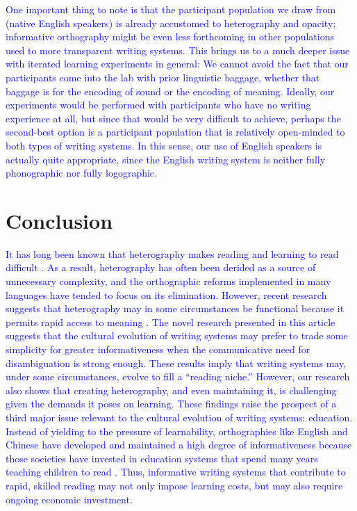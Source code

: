 \documentclass[doc,biblatex]{apa7}
\newcommand\newmaterial[1]{\textcolor{blue}{#1}}
\begin{document}
\newmaterial{One important thing to note is that the participant population we draw from (native English speakers) is already accustomed to heterography and opacity; informative orthography might be even less forthcoming in other populations used to more transparent writing systems. This brings us to a much deeper issue with iterated learning experiments in general: We cannot avoid the fact that our participants come into the lab with prior linguistic baggage, whether that baggage is for the encoding of sound or the encoding of meaning. Ideally, our experiments would be performed with participants who have no writing experience at all, but since that would be very difficult to achieve, perhaps the second-best option is a participant population that is relatively open-minded to both types of writing systems. In this sense, our use of English speakers is actually quite appropriate, since the English writing system is neither fully phonographic nor fully logographic.}

\section{Conclusion}

\newmaterial{It has long been known that heterography makes reading and learning to read difficult \parencite{Pexman:2001, Seymour:2003}. As a result, heterography has often been derided as a source of unnecessary complexity, and the orthographic reforms implemented in many languages have tended to focus on its elimination. However, recent research suggests that heterography may in some circumstances be functional because it permits rapid access to meaning \parencite{Rastle:2019, Ulicheva:2020}. The novel research presented in this article suggests that the cultural evolution of writing systems may prefer to trade some simplicity for greater informativeness when the communicative need for disambiguation is strong enough. These results imply that writing systems may, under some circumstances, evolve to fill a “reading niche.” However, our research also shows that creating heterography, and even maintaining it, is challenging given the demands it poses on learning. These findings raise the prospect of a third major issue relevant to the cultural evolution of writing systems: education. Instead of yielding to the pressure of learnability, orthographies like English and Chinese have developed and maintained a high degree of informativeness because those societies have invested in education systems that spend many years teaching children to read \parencite[e.g.,][]{Xinchun:1999}. Thus, informative writing systems that contribute to rapid, skilled reading may not only impose learning costs, but may also require ongoing economic investment.}
\end{document}
